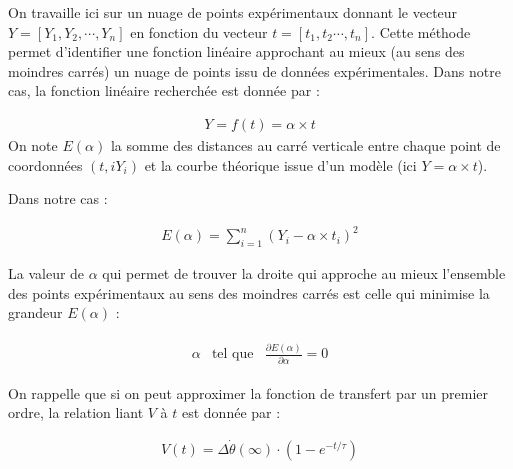 \begin{prop}
On travaille ici sur un nuage de points expérimentaux donnant le vecteur $Y=\left[Y_1,Y_2,\cdots, Y_n\right]$ en fonction du vecteur $t=\left[t_1,t_2\cdots,t_n\right]$.
Cette méthode permet d'identifier une fonction linéaire approchant au mieux (au sens des moindres carrés) un nuage de points issu de données expérimentales.
Dans notre cas, la fonction linéaire recherchée est donnée par :

\begin{align*}
Y=f(t)=\alpha\times t
\end{align*}
On note $E(\alpha)$ la somme des distances au carré verticale entre chaque point de coordonnées $(t,iY_i)$ et la courbe théorique issue d'un modèle (ici $Y=\alpha\times t$).

Dans notre cas :

\begin{align*}
E(\alpha)=\sum^n_{i=1}\left(Y_i-\alpha\times t_i\right)^2
\end{align*}

La valeur de $\alpha$ qui permet de trouver la droite qui approche au mieux l'ensemble des points expérimentaux au sens des moindres carrés est celle qui minimise la grandeur $E(\alpha)$ : 

\begin{align*}
\begin{array}{ccc}
\alpha & \mbox{tel que} & \frac{\partial E(\alpha)}{\partial \alpha}=0
\end{array}
\end{align*}

\end{prop}






On rappelle que si on peut approximer la fonction de transfert par un premier ordre, la relation liant $V$ à $t$ est donnée par :

\begin{align*}
V(t)=\Delta \dot{\theta}(\infty)\cdot \left(1-e^{-t/\tau}\right)
\end{align*}




